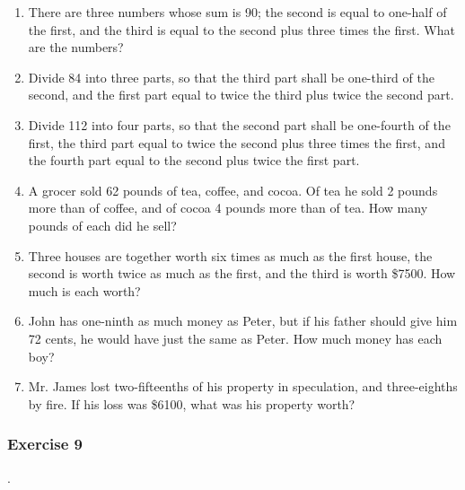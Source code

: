\documentclass{book}
\begin{document}
\begin{enumerate}
\item There are three numbers whose sum is 90; the second is equal
to one-half of the first, and the third is equal to the second
plus three times the first. What are the numbers?

\item Divide 84 into three parts, so that the third part shall be
one-third of the second, and the first part equal to twice the
third plus twice the second part.

\item Divide 112 into four parts, so that the second part shall be
one-fourth of the first, the third part equal to twice the second
plus three times the first, and the fourth part equal to the
second plus twice the first part.

\item A grocer sold 62 pounds of tea, coffee, and cocoa. Of tea he
sold 2 pounds more than of coffee, and of cocoa 4 pounds more than
of tea. How many pounds of each did he sell?

\item Three houses are together worth six times as much as the
first house, the second is worth twice as much as the first, and
the third is worth \$7500. How much is each worth?

\item John has one-ninth as much money as Peter, but if his father
should give him 72 cents, he would have just the same as Peter.
How much money has each boy?

\item Mr. James lost two-fifteenths of his property in
speculation, and three-eighths by fire. If his loss was \$6100,
what was his property worth?
\end{enumerate}

\subsubsection*{Exercise 9}.
\end{document}
